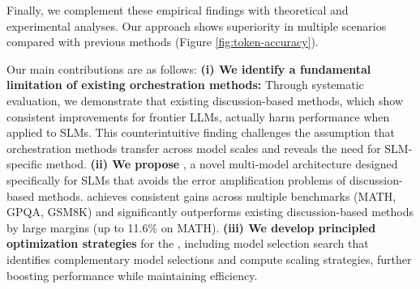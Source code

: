
Finally, we complement these empirical findings with theoretical and experimental analyses. Our approach shows superiority in multiple scenarios compared with previous methods (Figure \ref{fig:token-accuracy}). 

Our main contributions are as follows:
% 
% 
\textbf{ (i) We identify a fundamental limitation of existing orchestration methods:} Through systematic evaluation, we demonstrate that existing discussion-based methods, which show consistent improvements for frontier LLMs, actually harm performance when applied to SLMs. This counterintuitive finding challenges the assumption that orchestration methods transfer across model scales and reveals the need for SLM-specific method.
% 
% 
% 
% 
\textbf{(ii) We propose \NAME{}}, a novel multi-model architecture designed specifically for SLMs that avoids the error amplification problems of discussion-based methods. \NAME{}{} achieves consistent gains across multiple benchmarks (MATH, GPQA, GSM8K) and significantly outperforms existing discussion-based methods by large margins (up to 11.6\% on MATH).
% 
% 
% 
\textbf{(iii) We develop principled optimization strategies} for the \NAME{}, including model selection search that identifies complementary model selections and compute scaling strategies, further boosting performance while maintaining efficiency.
% 
% 

